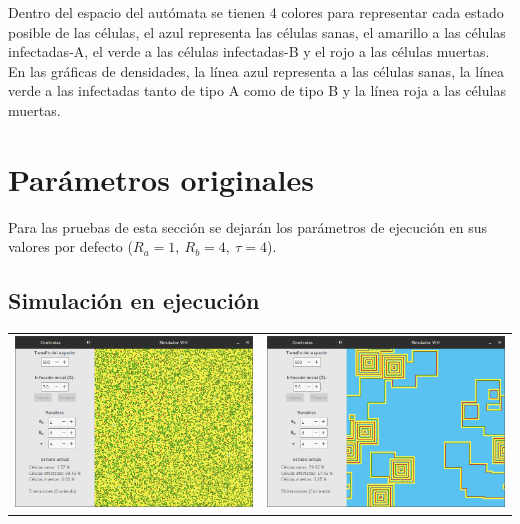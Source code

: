 \documentclass[12pt,letterpaper,oneside]{report}
\begin{document}
	Dentro del espacio del autómata se tienen 4 colores para representar cada estado posible de las células, el azul representa las células sanas, el amarillo a las células infectadas-A, el verde a las células infectadas-B y el rojo a las células muertas.\\

	En las gráficas de densidades, la línea azul representa a las células sanas, la línea verde a las infectadas tanto de tipo A como de tipo B y la línea roja a las células muertas.

	\section{Parámetros originales} %
	\label{sec:par_metros_originales}
	Para las pruebas de esta sección se dejarán los parámetros de ejecución en sus valores por defecto ($R_a = 1,\ R_b = 4,\ \tau = 4$).

	\subsection{Simulación en ejecución} %
	\label{sub:simulaci_n_en_ejecuci_n}
	\begin{center}
		\begin{tabular}{c c}
		\includegraphics[width=8cm]{img/original/prueba/1.png} & \includegraphics[width=8cm]{img/original/prueba/2.png} \\
		\end{tabular}
	\end{center}
\end{document}
